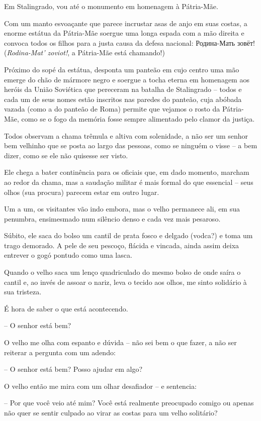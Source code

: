 Em Stalingrado, vou até o monumento em homenagem à Pátria-Mãe.

Com um manto esvoaçante que parece incrustar asas de anjo em suas
costas, a enorme estátua da Pátria-Mãe soergue uma longa espada com a
mão direita e convoca todos os filhos para a justa causa da defesa
nacional: Родина-Мать зовёт! (\emph{Rodina-Mat' zoviot!}, a Pátria-Mãe
está chamando!)

Próximo do sopé da estátua, desponta um panteão em cujo centro uma mão
emerge do chão de mármore negro e soergue a tocha eterna em homenagem
aos heróis da União Soviética que pereceram na batalha de Stalingrado --
todos e cada um de seus nomes estão inscritos nas paredes do panteão,
cuja abóbada vazada (como a do panteão de Roma) permite que vejamos o
rosto da Pátria-Mãe, como se o fogo da memória fosse sempre alimentado
pelo clamor da justiça.

Todos observam a chama trêmula e altiva com solenidade, a não ser um
senhor bem velhinho que se posta ao largo das pessoas, como se ninguém o
visse -- a bem dizer, como se ele não quisesse ser visto.

Ele chega a bater continência para os oficiais que, em dado momento,
marcham ao redor da chama, mas a saudação militar é mais formal do que
essencial -- seus olhos (sua procura) parecem estar em outro lugar.

Um a um, os visitantes vão indo embora, mas o velho permanece ali, em
sua penumbra, ensimesmado num silêncio denso e cada vez mais pesaroso.

Súbito, ele saca do bolso um cantil de prata fosco e delgado (vodca?) e
toma um trago demorado. A pele de seu pescoço, flácida e vincada, ainda
assim deixa entrever o gogó pontudo como uma lasca.

Quando o velho saca um lenço quadriculado do mesmo bolso de onde saíra o
cantil e, ao invés de assoar o nariz, leva o tecido aos olhos, me sinto
solidário à sua tristeza.

É hora de saber o que está acontecendo.

-- O senhor está bem?

O velho me olha com espanto e dúvida -- não sei bem o que fazer, a não
ser reiterar a pergunta com um adendo:

-- O senhor está bem? Posso ajudar em algo?

O velho então me mira com um olhar desafiador -- e sentencia:

-- Por que você veio até mim? Você está realmente preocupado comigo ou
apenas não quer se sentir culpado ao virar as costas para um velho
solitário?

